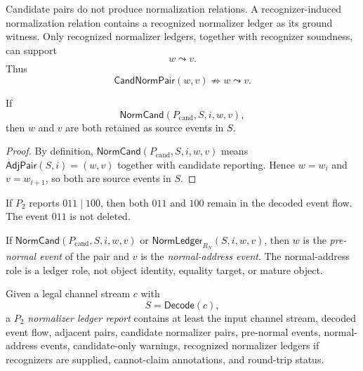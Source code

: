 \begin{principle}
\label{prin:source-normalizer-no-normalization-without-recognizer}
Candidate pairs do not produce normalization relations. A recognizer-induced normalization relation contains a recognized normalizer ledger as its ground witness. Only recognized normalizer ledgers, together with recognizer soundness, can support
$$
  w\leadsto v.
$$
Thus
$$
  \mathsf{CandNormPair}(w,v)
  \not\Rightarrow
  w\leadsto v.
$$
\end{principle}

\begin{proposition}
\label{prop:source-normalizer-candidate-preserves-raw}
If
$$
  \mathsf{NormCand}(P_{\mathrm{cand}},S,i,w,v),
$$
then $w$ and $v$ are both retained as source events in $S$.
\end{proposition}

\begin{proof}
By definition, $\mathsf{NormCand}(P_{\mathrm{cand}},S,i,w,v)$ means $\mathsf{AdjPair}(S,i)=(w,v)$ together with candidate reporting. Hence $w=w_i$ and $v=w_{i+1}$, so both are source events in $S$.
\end{proof}

\begin{corollary}
\label{cor:source-normalizer-candidate-does-not-erase}
If $P_2$ reports $011\mid 100$, then both $011$ and $100$ remain in the decoded event flow. The event $011$ is not deleted.
\end{corollary}

\begin{definition}
\label{def:source-normalizer-pre-normal-normal-address}
If $\mathsf{NormCand}(P_{\mathrm{cand}},S,i,w,v)$ or $\mathsf{NormLedger}_{R_N}(S,i,w,v)$, then $w$ is the \emph{pre-normal event} of the pair and $v$ is the \emph{normal-address event}. The normal-address role is a ledger role, not object identity, equality target, or mature object.
\end{definition}

\begin{definition}
\label{def:source-normalizer-p2-report}
Given a legal channel stream $c$ with
$$
  S=\mathsf{Decode}(c),
$$
a \emph{$P_2$ normalizer ledger report} contains at least the input channel stream, decoded event flow, adjacent pairs, candidate normalizer pairs, pre-normal events, normal-address events, candidate-only warnings, recognized normalizer ledgers if recognizers are supplied, cannot-claim annotations, and round-trip status.
\end{definition}

